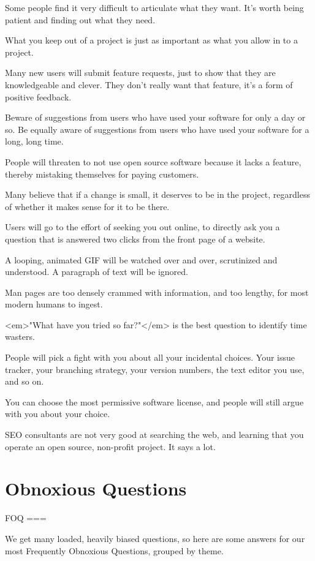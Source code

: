 \documentclass[t,handout]{beamer}
\begin{document}
Some people find it very difficult to articulate what they want. It's worth being patient and finding out what they need.

What you keep out of a project is just as important as what you allow in to a project.

Many new users will submit feature requests, just to show that they are knowledgeable and clever. They don't really want that feature, it's a form of positive feedback.

Beware of suggestions from users who have used your software for only a day or so. Be equally aware of suggestions from users who have used your software for a long, long time.

People will threaten to not use open source software because it lacks a feature, thereby mistaking themselves for paying customers.

Many believe that if a change is small, it deserves to be in the project, regardless of whether it makes sense for it to be there.

Users will go to the effort of seeking you out online, to directly ask you a question that is answered two clicks from the front page of a website.

A looping, animated GIF will be watched over and over, scrutinized and understood. A paragraph of text will be ignored.

Man pages are too densely crammed with information, and too lengthy, for most modern humans to ingest.

<em>"What have you tried so far?"</em> is the best question to identify time wasters.

People will pick a fight with you about all your incidental choices. Your issue tracker, your branching strategy, your version numbers, the text editor you use, and so on.

You can choose the most permissive software license, and people will still argue with you about your choice.

SEO consultants are not very good at searching the web, and learning that you operate an open source, non-profit project. It says a lot.
\fi

\section{Obnoxious Questions}

\iffalse
FOQ
===

We get many loaded, heavily biased questions, so here are some answers for our most Frequently Obnoxious Questions, grouped by theme.
\end{document}
